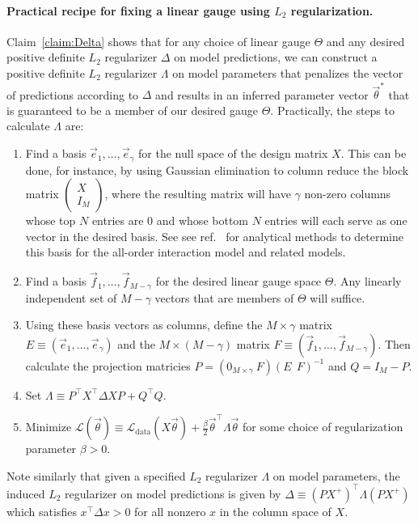 \documentclass{article}
\numberwithin{myclaim}{section}
\begin{document}
\paragraph*{Practical recipe for fixing a linear gauge using $L_2$ regularization.}
Claim~\ref{claim:Delta} shows that for any choice of linear gauge $\Theta$ and any desired positive definite $L_2$ regularizer $\Delta$ on model predictions, we can construct a positive definite $L_2$ regularizer $\Lambda$ on model parameters that penalizes the vector of predictions according to $\Delta$ and results in an inferred parameter vector $\vec{\theta}^*$ that is guaranteed to be a member of our desired gauge $\Theta$.  Practically, the steps to calculate $\Lambda$ are:
\begin{enumerate}
\item Find a basis $\vec{e}_1, \ldots, \vec{e}_\gamma$ for the null space of the design matrix $X$. This can be done, for instance, by using Gaussian elimination to column reduce the block matrix $\left( \begin{array}{c} X \\ I_M \end{array}\right)$, where the resulting matrix will have $\gamma$ non-zero columns whose top $N$ entries are 0 and whose bottom $N$ entries will each serve as one vector in the desired basis. See see ref.\ \cite{Posfai:2024bb} for analytical methods to determine this basis for the all-order interaction model and related models.
\item Find a basis $\vec{f}_1, \ldots, \vec{f}_{M-\gamma}$ for the desired linear gauge space $\Theta$. Any linearly independent set of $M-\gamma$ vectors that are members of $\Theta$ will suffice.
\item Using these basis vectors as columns, define the $M \times \gamma$ matrix $E \equiv (\vec{e}_1, \ldots, \vec{e}_\gamma)$ and the $M \times (M-\gamma)$ matrix $F \equiv (\vec{f}_1, \ldots, \vec{f}_{M-\gamma})$. Then calculate the projection matricies $P = (0_{M \times \gamma}~F)\left( E~~F \right)^{-1}$ and $Q=I_M-P$.
\item Set $\Lambda \equiv P^\top X^\top \Delta X P + Q^\top Q$.
\item Minimize $ \mathcal{L}(\vec{\theta}) \equiv \mathcal{L}_\mathrm{data}(X\vec{\theta}) + \frac{\beta}{2} \vec{\theta}^\top \Lambda \vec{\theta}$ for some choice of regularization parameter $\beta>0$.
\end{enumerate}
Note similarly that given a specified $L_2$ regularizer $\Lambda$ on model parameters, the induced $L_2$ regularizer on model predictions is given by $\Delta \equiv \left(PX^+\right)^\top\Lambda \left(P X^+\right)$ which satisfies $x^\top\Delta x>0$ for all nonzero $x$ in the column space of $X$.
\end{document}
